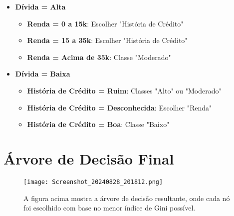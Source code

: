 \documentclass[a4paper,12pt]{article}
\begin{document}
\begin{itemize}
    \item \textbf{Dívida = Alta}
        \begin{itemize}
            \item \textbf{Renda = 0 a 15k}: Escolher "História de Crédito"
            \item \textbf{Renda = 15 a 35k}: Escolher "História de Crédito"
            \item \textbf{Renda = Acima de 35k}: Classe "Moderado"
        \end{itemize}
    \item \textbf{Dívida = Baixa}
        \begin{itemize}
            \item \textbf{História de Crédito = Ruim}: Classes "Alto" ou "Moderado"
            \item \textbf{História de Crédito = Desconhecida}: Escolher "Renda"
            \item \textbf{História de Crédito = Boa}: Classe "Baixo"
        \end{itemize}
\end{itemize}

\section{Árvore de Decisão Final}

\begin{figure}[H]
    \centering
    \texttt{[image: Screenshot\_20240828\_201812.png]}
    \caption{A figura acima mostra a árvore de decisão resultante, onde cada nó foi escolhido com base no menor índice de Gini possível.}
    \label{fig:enter-label}
\end{figure}
\end{document}
